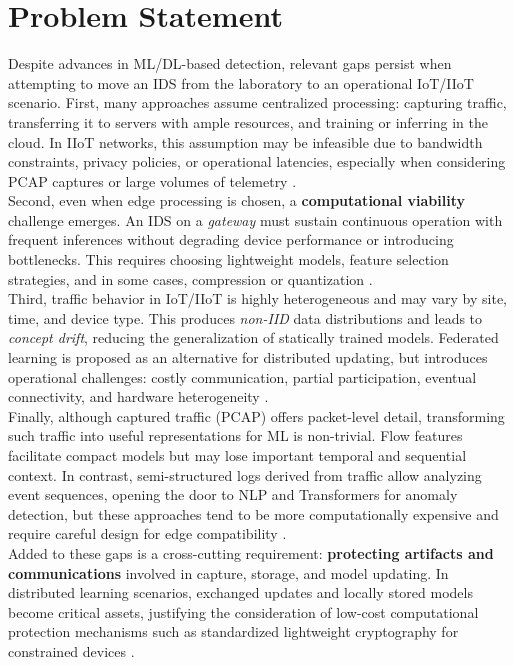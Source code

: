 \section{Problem Statement}

Despite advances in ML/DL-based detection, relevant gaps persist when attempting to move an IDS from the laboratory to an operational IoT/IIoT scenario. First, many approaches assume centralized processing: capturing traffic, transferring it to servers with ample resources, and training or inferring in the cloud. In IIoT networks, this assumption may be infeasible due to bandwidth constraints, privacy policies, or operational latencies, especially when considering PCAP captures or large volumes of telemetry \cite{Tekin2023_OnDeviceEnergy}.\\
\newline
Second, even when edge processing is chosen, a \textbf{computational viability} challenge emerges. An IDS on a \textit{gateway} must sustain continuous operation with frequent inferences without degrading device performance or introducing bottlenecks. This requires choosing lightweight models, feature selection strategies, and in some cases, compression or quantization \cite{DuttaBharali2021_TinyMLSurvey}.\\
\newline
Third, traffic behavior in IoT/IIoT is highly heterogeneous and may vary by site, time, and device type. This produces \textit{non-IID} data distributions and leads to \textit{concept drift}, reducing the generalization of statically trained models. Federated learning is proposed as an alternative for distributed updating, but introduces operational challenges: costly communication, partial participation, eventual connectivity, and hardware heterogeneity \cite{Imteaj2022_FL_ResourceConstrainedSurvey, Hajj2023_CrossLayerFL_IDS}.\\
\newline
Finally, although captured traffic (PCAP) offers packet-level detail, transforming such traffic into useful representations for ML is non-trivial. Flow features facilitate compact models but may lose important temporal and sequential context. In contrast, semi-structured logs derived from traffic allow analyzing event sequences, opening the door to NLP and Transformers for anomaly detection, but these approaches tend to be more computationally expensive and require careful design for edge compatibility \cite{LogBERT2021, LTAnomaly2023}.\\
\newline
Added to these gaps is a cross-cutting requirement: \textbf{protecting artifacts and communications} involved in capture, storage, and model updating. In distributed learning scenarios, exchanged updates and locally stored models become critical assets, justifying the consideration of low-cost computational protection mechanisms such as standardized lightweight cryptography for constrained devices \cite{NIST_SP800232_2025}.

